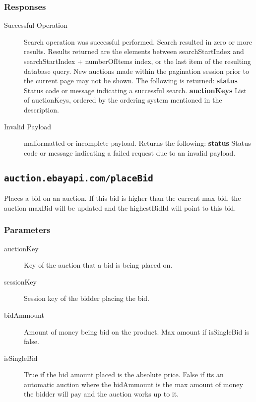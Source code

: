 \documentclass{article}
\newcommand{\code}[1]{\colorbox{light-gray}{\texttt{#1}}}
\begin{document}
\subsubsection{Responses}

\begin{description}
    \item[Successful Operation] Search operation was successful performed.
        Search resulted in zero or more results. Results returned are the
        elements between searchStartIndex and searchStartIndex + numberOfItems
        index, or the last item of the resulting database query.  New auctions
        made within the pagination session prior to the current page may not be
        shown. The following is returned:
        \subitem\textbf{status} Status code or message indicating a successful
        search.
        \subitem\textbf{auctionKeys} List of auctionKeys, ordered by the
        ordering system mentioned in the description.

    \item[Invalid Payload] malformatted or incomplete payload. Returns the
        following:
        \subitem\textbf{status} Status code or message indicating a failed
        request due to an invalid payload.
\end{description}

\subsection{\code{auction.ebayapi.com/placeBid}}
Places a bid on an auction. If this bid is higher than the current max bid, the
auction maxBid will be updated and the highestBidId will point to this bid.

\subsubsection{Parameters}

\begin{description}
    \item[auctionKey] Key of the auction that a bid is being placed on.
    \item[sessionKey] Session key of the bidder placing the bid.
    \item[bidAmmount] Amount of money being bid on the product. Max amount if isSingleBid is false.
    \item[isSingleBid] True if the bid amount placed is the absolute price.
        False if its an automatic auction where the bidAmmount is the max
        amount of money the bidder will pay and the auction works up to
        it.
\end{description}
\end{document}
